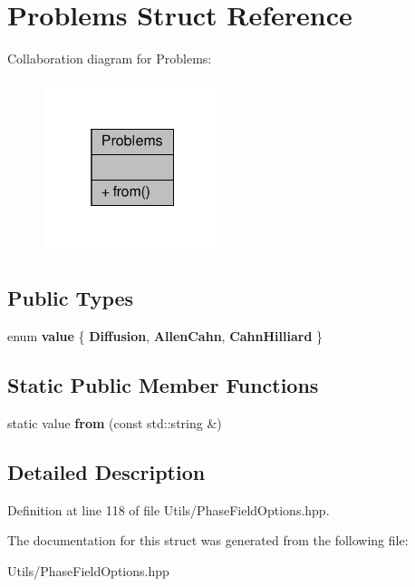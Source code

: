 \hypertarget{structProblems}{}\section{Problems Struct Reference}
\label{structProblems}


Collaboration diagram for Problems\+:\nopagebreak
\begin{figure}[H]
\begin{center}
\leavevmode
\includegraphics[width=148pt]{structProblems__coll__graph}
\end{center}
\end{figure}
\subsection*{Public Types}
\begin{DoxyCompactItemize}
\item 
\mbox{\label{structProblems_a612aafd57af03188e90e32ccf486cdfd}} 
enum {\bfseries value} \{ {\bfseries Diffusion}, 
{\bfseries Allen\+Cahn}, 
{\bfseries Cahn\+Hilliard}
 \}
\end{DoxyCompactItemize}
\subsection*{Static Public Member Functions}
\begin{DoxyCompactItemize}
\item 
\mbox{\label{structProblems_ae8478754a5b0fc89a73dde1ee7f84a2b}} 
static value {\bfseries from} (const std\+::string \&)
\end{DoxyCompactItemize}


\subsection{Detailed Description}


Definition at line 118 of file Utils/\+Phase\+Field\+Options.\+hpp.



The documentation for this struct was generated from the following file\+:\begin{DoxyCompactItemize}
\item 
Utils/\+Phase\+Field\+Options.\+hpp\end{DoxyCompactItemize}
